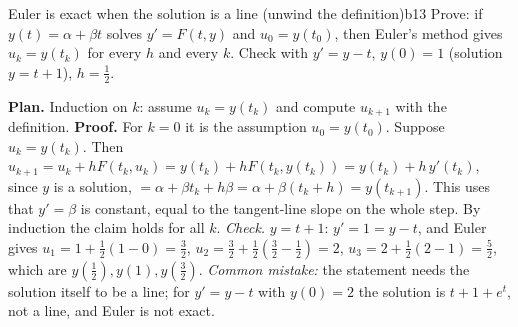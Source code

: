 \documentclass[11pt]{article}
\begin{document}
\begin{exmp}{Euler is exact when the solution is a line (unwind the definition)}{b13}
Prove: if $y(t)=\alpha+\beta t$ solves $y'=F(t,y)$ and $u_0=y(t_0)$, then Euler's method gives $u_k=y(t_k)$ for every $h$ and every $k$. Check with $y'=y-t$, $y(0)=1$ (solution $y=t+1$), $h=\frac12$.

\textbf{Plan.} Induction on $k$: assume $u_k=y(t_k)$ and compute $u_{k+1}$ with the definition.
\textbf{Proof.} For $k=0$ it is the assumption $u_0=y(t_0)$. Suppose $u_k=y(t_k)$. Then $u_{k+1}=u_k+hF(t_k,u_k)=y(t_k)+hF(t_k,y(t_k))=y(t_k)+h\,y'(t_k)$, since $y$ is a solution, $=\alpha+\beta t_k+h\beta=\alpha+\beta(t_k+h)=y(t_{k+1})$. This uses that $y'=\beta$ is constant, equal to the tangent-line slope on the whole step. By induction the claim holds for all $k$.
\emph{Check.} $y=t+1$: $y'=1=y-t$, and Euler gives $u_1=1+\frac12(1-0)=\frac32$, $u_2=\frac32+\frac12\left(\frac32-\frac12\right)=2$, $u_3=2+\frac12(2-1)=\frac52$, which are $y(\frac12),y(1),y(\frac32)$. \emph{Common mistake:} the statement needs the solution itself to be a line; for $y'=y-t$ with $y(0)=2$ the solution is $t+1+e^t$, not a line, and Euler is not exact.
\end{exmp}
\end{document}
